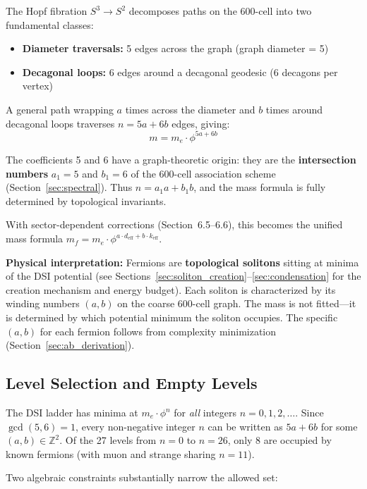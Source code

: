 \documentclass[12pt,a4paper]{article}
\begin{document}
The Hopf fibration $S^3 \to S^2$ decomposes paths on the 600-cell into two fundamental classes:
\begin{itemize}
    \item \textbf{Diameter traversals:} 5 edges across the graph (graph diameter = 5)
    \item \textbf{Decagonal loops:} 6 edges around a decagonal geodesic (6 decagons per vertex)
\end{itemize}

A general path wrapping $a$ times across the diameter and $b$ times around decagonal loops traverses $n = 5a + 6b$ edges, giving:
\begin{equation}
m = m_e \cdot \phi^{5a + 6b}
\end{equation}

The coefficients 5 and 6 have a graph-theoretic origin: they are the \textbf{intersection numbers} $a_1 = 5$ and $b_1 = 6$ of the 600-cell association scheme (Section~\ref{sec:spectral}). Thus $n = a_1 a + b_1 b$, and the mass formula is fully determined by topological invariants.

With sector-dependent corrections (Section~6.5--6.6), this becomes the unified mass formula $m_f = m_e \cdot \phi^{a \cdot d_{\text{eff}} + b \cdot k_{\text{eff}}}$.

\textbf{Physical interpretation:} Fermions are \textbf{topological solitons} sitting at minima of the DSI potential (see Sections~\ref{sec:soliton_creation}--\ref{sec:condensation} for the creation mechanism and energy budget). Each soliton is characterized by its winding numbers $(a,b)$ on the coarse 600-cell graph. The mass is not fitted---it is determined by which potential minimum the soliton occupies. The specific $(a,b)$ for each fermion follows from complexity minimization (Section~\ref{sec:ab_derivation}).

\subsection{Level Selection and Empty Levels}
\label{sec:level_selection}

The DSI ladder has minima at $m_e \cdot \phi^n$ for \emph{all} integers $n = 0, 1, 2, \ldots$. Since $\gcd(5,6)=1$, every non-negative integer $n$ can be written as $5a + 6b$ for some $(a,b) \in \mathbb{Z}^2$. Of the 27 levels from $n=0$ to $n=26$, only 8 are occupied by known fermions (with muon and strange sharing $n=11$).

Two algebraic constraints substantially narrow the allowed set:
\end{document}
